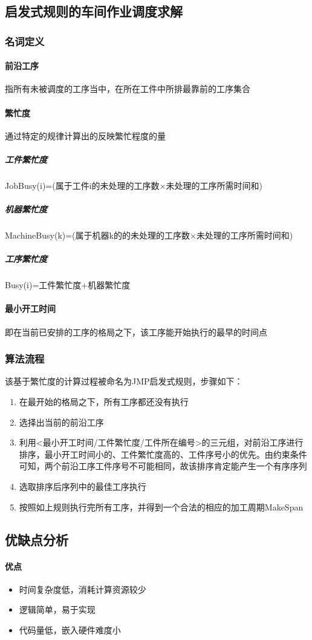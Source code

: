 \documentclass[UTF8]{ctexart}
\begin{document}
\begin{multicols}{2}
\subsection{启发式规则的车间作业调度求解}
\subsubsection{名词定义}
\paragraph{前沿工序}指所有未被调度的工序当中，在所在工件中所排最靠前的工序集合
\paragraph{繁忙度}通过特定的规律计算出的反映繁忙程度的量
\subparagraph{工件繁忙度}JobBusy(i)=(属于工件i的未处理的工序数$\times$未处理的工序所需时间和)
\subparagraph{机器繁忙度}MachineBusy(k)=(属于机器k的的未处理的工序数$\times$未处理的工序所需时间和)
\subparagraph{工序繁忙度}Busy(i)=工件繁忙度+机器繁忙度
\paragraph{最小开工时间}即在当前已安排的工序的格局之下，该工序能开始执行的最早的时间点
\subsubsection{算法流程}该基于繁忙度的计算过程被命名为JMP启发式规则，步骤如下：
\begin{enumerate}
	\item 在最开始的格局之下，所有工序都还没有执行
	\item 选择出当前的前沿工序
	\item 利用<最小开工时间/工件繁忙度/工件所在编号>的三元组，对前沿工序进行排序，最小开工时间小的、工件繁忙度高的、工件序号小的优先。由约束条件可知，两个前沿工序工件序号不可能相同，故该排序肯定能产生一个有序序列
	\item 选取排序后序列中的最佳工序执行
	\item 按照如上规则执行完所有工序，并得到一个合法的相应的加工周期MakeSpan
\end{enumerate}
\subsection{优缺点分析}
\paragraph{优点}
\begin{itemize}
	\item 时间复杂度低，消耗计算资源较少
	\item 逻辑简单，易于实现
	\item 代码量低，嵌入硬件难度小
\end{itemize}

\end{multicols}
\end{document}

